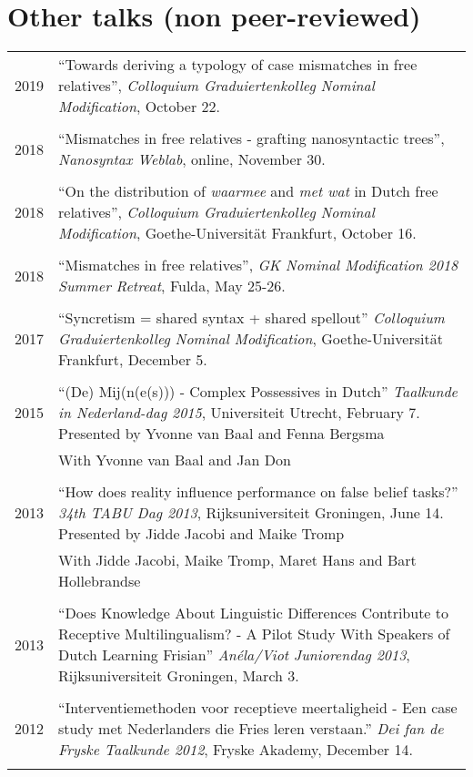 \documentclass[12pt]{article}
\begin{document}
\section{Other talks (non peer-reviewed)}
\begin{tabular}{p{3cm}l}
2019 & ``Towards deriving a typology of case mismatches in free relatives'', \emph{Colloquium Graduiertenkolleg Nominal Modification}, October 22.\\&\\
2018 & ``Mismatches in free relatives - grafting nanosyntactic trees'', \emph{Nanosyntax Weblab}, online, November 30.\\&\\
2018 & ``On the distribution of \emph{waarmee} and \emph{met wat} in Dutch free relatives'', \emph{Colloquium Graduiertenkolleg Nominal Modification}, Goethe-Universität Frankfurt, October 16.\\&\\
2018 & ``Mismatches in free relatives'', \emph{GK Nominal Modification 2018 Summer Retreat}, Fulda, May 25-26.\\&\\
2017 & ``Syncretism = shared syntax + shared spellout'' \emph{Colloquium Graduiertenkolleg Nominal Modification}, Goethe-Universität Frankfurt, December 5.\\&\\
2015 & ``(De) Mij(n(e(s))) - Complex Possessives in Dutch'' \emph{Taalkunde in Nederland-dag 2015}, Universiteit Utrecht, February 7. Presented by Yvonne van Baal and Fenna Bergsma \\& With Yvonne van Baal and Jan Don \\&\\
2013 & ``How does reality influence performance on false belief tasks?'' \emph{34th TABU Dag 2013}, Rijksuniversiteit Groningen, June 14. Presented by Jidde Jacobi and Maike Tromp \\
& With Jidde Jacobi, Maike Tromp, Maret Hans and Bart Hollebrandse\\&\\
2013 & ``Does Knowledge About Linguistic Differences Contribute to Receptive Multilingualism? - A Pilot Study With Speakers of Dutch Learning Frisian'' \emph{Anéla/Viot Juniorendag 2013}, Rijksuniversiteit Groningen, March 3.\\&\\
2012 & ``Interventiemethoden voor receptieve meertaligheid - Een case study met
Nederlanders die Fries leren verstaan.'' \emph{Dei fan de Fryske Taalkunde 2012}, Fryske Akademy, December 14.\\&\\
\end{tabular}
\end{document}
